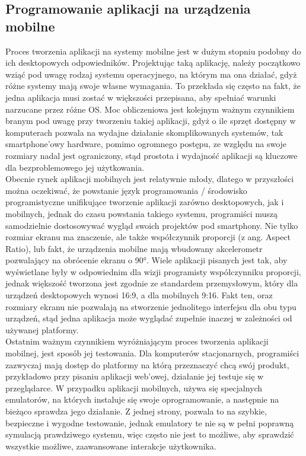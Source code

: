 \documentclass[12pt, a4paper]{article}
\begin{document}
\begin{sloppypar}
{  \subsection{Programowanie aplikacji na urządzenia mobilne}
  {
    Proces tworzenia aplikacji na systemy mobilne jest w dużym stopniu podobny do
    ich desktopowych odpowiedników. Projektując taką aplikację, należy początkowo wziąć
    pod uwagę rodzaj systemu operacyjnego, na którym ma ona działać, gdyż różne systemy
    mają swoje własne wymagania. To przekłada się często na fakt, że jedna aplikacja musi
    zostać w większości przepisana, aby spełniać warunki narzucane przez różne OS.
    Moc obliczeniowa jest kolejnym ważnym czynnikiem branym pod uwagę przy tworzeniu
    takiej aplikacji, gdyż o ile sprzęt dostępny w komputerach pozwala na wydajne
    działanie skomplikowanych systemów, tak smartphone'owy hardware, pomimo ogromnego
    postępu, ze względu na swoje rozmiary nadal jest ograniczony, stąd prostota i
    wydajność aplikacji są kluczowe dla bezproblemowego jej użytkowania.\\
    Obecnie rynek aplikacji mobilnych jest relatywnie młody, dlatego w przyszłości
    można oczekiwać, że powstanie język programowania / środowisko programistyczne
    unifikujące tworzenie aplikacji zarówno desktopowych, jak i mobilnych, jednak do
    czasu powstania takiego systemu, programiści muszą samodzielnie dostosowywać wygląd
    swoich projektów pod smartphony. Nie tylko rozmiar ekranu ma znaczenie, ale
    także współczynnik proporcji (z ang. Aspect Ratio), lub fakt, że urządzenia mobilne
    mają wbudowany akcelerometr pozwalający na obrócenie ekranu o \ang{90}. Wiele aplikacji
    pisanych jest tak, aby wyświetlane były w odpowiednim dla wizji programisty współczynniku
    proporcji, jednak większość tworzona jest zgodnie ze standardem przemysłowym,
    który dla urządzeń desktopowych wynosi 16:9, a dla mobilnych 9:16. Fakt ten, oraz
    rozmiary ekranu nie pozwalają na stworzenie jednolitego interfejsu dla obu typu
    urządzeń, stąd jedna aplikacja może wyglądać zupełnie inaczej w zależności od
    używanej platformy.\\
    Ostatnim ważnym czynnikiem wyróżniającym proces tworzenia aplikacji mobilnej, jest
    sposób jej testowania. Dla komputerów stacjonarnych, programiści zazwyczaj mają
    dostęp do platformy na którą przeznaczyć chcą swój produkt, przykładowo przy
    pisaniu aplikacji web'owej, działanie jej testuje się w przeglądarce. W przypadku
    aplikacji mobilnych, używa się specjalnych emulatorów, na których instaluje się
    swoje oprogramowanie, a następnie na bieżąco sprawdza jego działanie. Z jednej
    strony, pozwala to na szybkie, bezpieczne i wygodne testowanie, jednak emulatory te
    nie są w pełni poprawną symulacją prawdziwego systemu, więc często nie jest to
    możliwe, aby sprawdzić wszystkie możliwe, zaawansowane interakcje użytkownika.
  }
}
\end{sloppypar}
\end{document}

